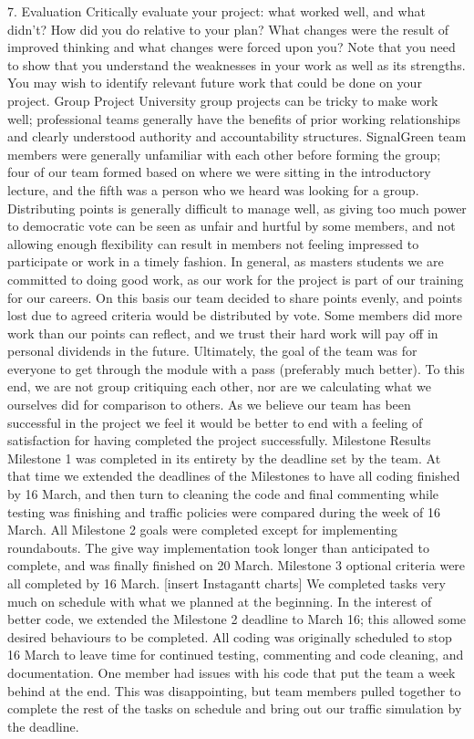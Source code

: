 \documentclass[11pt]{article}
\begin{document}
7. Evaluation Critically evaluate your project: what worked well, and what didn’t? How did you do relative to your plan? What changes were the result of improved thinking and what changes were forced upon you? Note that you need to show that you understand the weaknesses in your work as well as its strengths. You may wish to identify relevant future work that could be done on your project.
Group Project
University group projects can be tricky to make work well; professional teams generally have the benefits of prior working relationships and clearly understood authority and accountability structures. SignalGreen team members were generally unfamiliar with each other before forming the group; four of our team formed based on where we were sitting in the introductory lecture, and the fifth was a person who we heard was looking for a group. 
Distributing points is generally difficult to manage well, as giving too much power to democratic vote can be seen as unfair and hurtful by some members, and not allowing enough flexibility can result in members not feeling impressed to participate or work in a timely fashion. 
In general, as masters students we are committed to doing good work, as our work for the project is part of our training for our careers. On this basis our team decided to share points evenly, and points lost due to agreed criteria would be distributed by vote. Some members did more work than our points can reflect, and we trust their hard work will pay off in personal dividends in the future.
Ultimately, the goal of the team was for everyone to get through the module with a pass (preferably much better). To this end, we are not group critiquing each other, nor are we calculating what we ourselves did for comparison to others. As we believe our team has been successful in the project we feel it would be better to end with a feeling of satisfaction for having completed the project successfully.
Milestone Results
Milestone 1 was completed in its entirety by the deadline set by the team. At that time we extended the deadlines of the Milestones to have all coding finished by 16 March, and then turn to cleaning the code and final commenting while testing was finishing and traffic policies were compared during the week of 16 March.
All Milestone 2 goals were completed except for implementing roundabouts. The give way implementation took longer than anticipated to complete, and was finally finished on 20 March.
Milestone 3 optional criteria were all completed by 16 March. 
[insert Instagantt charts] 
We completed tasks very much on schedule with what we planned at the beginning. In the interest of better code, we extended the Milestone 2 deadline to March 16; this allowed some desired behaviours to be completed. All coding was originally scheduled to stop 16 March to leave time for continued testing, commenting and code cleaning, and documentation. 
One member had issues with his code that put the team a week behind at the end. This was disappointing, but team members pulled together to complete the rest of the tasks on schedule and bring out our traffic simulation by the deadline.
\end{document}
